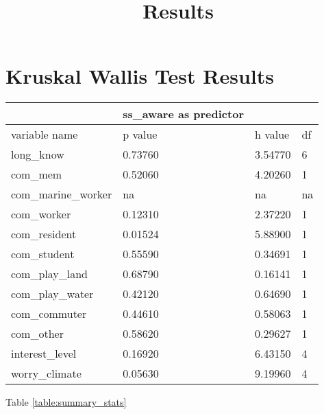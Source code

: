 \documentclass{article}
\title{Results}
\begin{document}

\section{Kruskal Wallis Test Results}
\begin{table}[!ht]
    \centering
    \begin{tabular}{|l|l|l|l|}
    \hline
         ~ & ss\_aware as predictor & ~ & ~ \\ \hline
        variable name & p value & h value & df \\ \hline
           long\_know & 0.73760 & 3.54770 & 6 \\ \hline
        com\_mem & 0.52060 & 4.20260 & 1 \\ \hline
        com\_marine\_worker & na & na & na \\ \hline
        com\_worker & 0.12310 & 2.37220 & 1 \\ \hline
        com\_resident & 0.01524 & 5.88900 & 1 \\ \hline
        com\_student & 0.55590 & 0.34691 & 1 \\ \hline
        com\_play\_land & 0.68790 & 0.16141 & 1 \\ \hline
        com\_play\_water & 0.42120 & 0.64690 & 1 \\ \hline
        com\_commuter & 0.44610 & 0.58063 & 1 \\ \hline
        com\_other & 0.58620 & 0.29627 & 1 \\ \hline
        interest\_level & 0.16920 & 6.43150 & 4 \\ \hline
        worry\_climate & 0.05630 & 9.19960 & 4 \\ \hline
    \end{tabular}
\end{table}


Table \ref{table:summary_stats}
\end{document}
